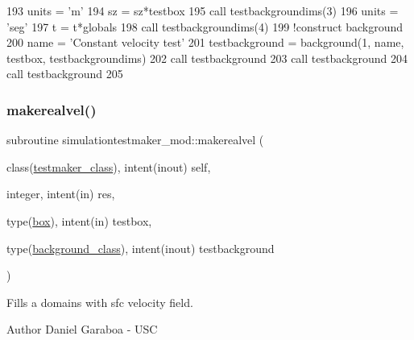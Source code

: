 \begin{DoxyCode}
193     units = \textcolor{stringliteral}{'m'}
194     sz = sz*testbox%
195     \textcolor{keyword}{call }testbackgroundims(3)%
196     units = \textcolor{stringliteral}{'seg'}
197     t = t*globals%
198     \textcolor{keyword}{call }testbackgroundims(4)%
199     \textcolor{comment}{!construct background}
200     name = \textcolor{stringliteral}{'Constant velocity test'}
201     testbackground = background(1, name, testbox, testbackgroundims)
202     \textcolor{keyword}{call }testbackground%
203     \textcolor{keyword}{call }testbackground%
204     \textcolor{keyword}{call }testbackground%
205 
\end{DoxyCode}
\mbox{\label{namespacesimulationtestmaker__mod_a99df61e4a45020aa1e2d30d33a4e2fa0}} 
\subsubsection{\texorpdfstring{makerealvel()}{makerealvel()}}
{\footnotesize\ttfamily subroutine simulationtestmaker\+\_\+mod\+::makerealvel (\begin{DoxyParamCaption}\item[{class(\mbox{\hyperlink{structsimulationtestmaker__mod_1_1testmaker__class}{testmaker\+\_\+class}}), intent(inout)}]{self,  }\item[{integer, intent(in)}]{res,  }\item[{type(\mbox{\hyperlink{structgeometry__mod_1_1box}{box}}), intent(in)}]{testbox,  }\item[{type(\mbox{\hyperlink{structbackground__mod_1_1background__class}{background\+\_\+class}}), intent(inout)}]{testbackground }\end{DoxyParamCaption})\hspace{0.3cm}{\ttfamily [private]}}



Fills a domain\textquotesingle{}s with sfc velocity field. 

\begin{DoxyAuthor}{Author}
Daniel Garaboa -\/ U\+SC 
\end{DoxyAuthor}


